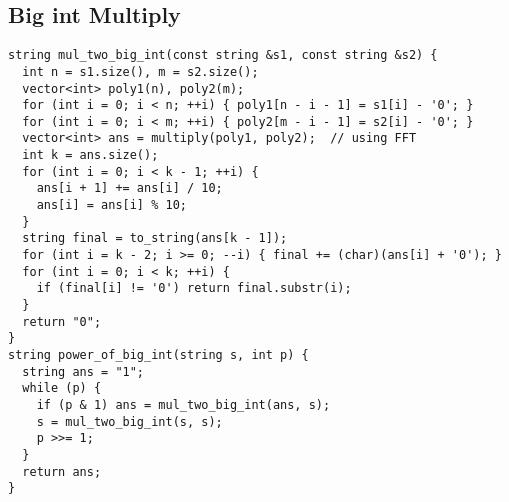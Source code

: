 \documentclass[twoside]{article}
\begin{document}
\begin{multicols*}{2}
{\subsection*{Big int Multiply}
}
\begin{verbatim}
string mul_two_big_int(const string &s1, const string &s2) {
  int n = s1.size(), m = s2.size();
  vector<int> poly1(n), poly2(m);
  for (int i = 0; i < n; ++i) { poly1[n - i - 1] = s1[i] - '0'; }
  for (int i = 0; i < m; ++i) { poly2[m - i - 1] = s2[i] - '0'; }
  vector<int> ans = multiply(poly1, poly2);  // using FFT
  int k = ans.size();
  for (int i = 0; i < k - 1; ++i) {
    ans[i + 1] += ans[i] / 10;
    ans[i] = ans[i] % 10;
  }
  string final = to_string(ans[k - 1]);
  for (int i = k - 2; i >= 0; --i) { final += (char)(ans[i] + '0'); }
  for (int i = 0; i < k; ++i) {
    if (final[i] != '0') return final.substr(i);
  }
  return "0";
}
string power_of_big_int(string s, int p) {
  string ans = "1";
  while (p) {
    if (p & 1) ans = mul_two_big_int(ans, s);
    s = mul_two_big_int(s, s);
    p >>= 1;
  }
  return ans;
}
\end{verbatim}

{
}
\end{multicols*}
\end{document}
